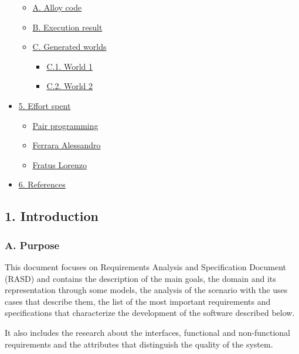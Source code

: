 \begin{itemize}
  \begin{itemize}
  \tightlist
  \item
    \protect\hyperlink{a-alloy-code}{A. Alloy code}
  \item
    \protect\hyperlink{b-execution-result}{B. Execution result}
  \item
    \protect\hyperlink{c-generated-worlds}{C. Generated worlds}

    \begin{itemize}
    \tightlist
    \item
      \protect\hyperlink{c1-world-1}{C.1. World 1}
    \item
      \protect\hyperlink{c2-world-2}{C.2. World 2}
    \end{itemize}
  \end{itemize}
\item
  \protect\hyperlink{5-effort-spent}{5. Effort spent}

  \begin{itemize}
  \tightlist
  \item
    \protect\hyperlink{pair-programming}{Pair programming}
  \item
    \protect\hyperlink{ferrara-alessandro}{Ferrara Alessandro}
  \item
    \protect\hyperlink{fratus-lorenzo}{Fratus Lorenzo}
  \end{itemize}
\item
  \protect\hyperlink{6-references}{6. References}
\end{itemize}

\hypertarget{introduction}{%
\subsection{1. Introduction}\label{introduction}}

\hypertarget{a.-purpose}{%
\subsubsection{A. Purpose}\label{a.-purpose}}

This document focuses on Requirements Analysis and Specification
Document (RASD) and contains the description of the main goals, the
domain and its representation through some models, the analysis of the
scenario with the uses cases that describe them, the list of the most
important requirements and specifications that characterize the
development of the software described below.

It also includes the research about the interfaces, functional and
non-functional requirements and the attributes that distinguish the
quality of the system.

